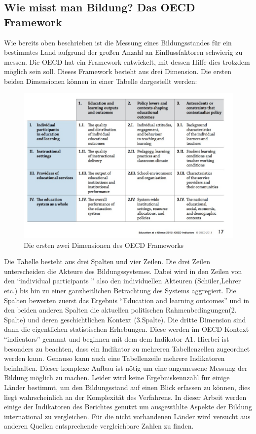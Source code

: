 \subsection*{Wie misst man Bildung? Das OECD Framework}
Wie bereits oben beschrieben ist die Messung eines Bildungsstandes für ein bestimmtes Land aufgrund der großen Anzahl an Einflussfaktoren schwierig zu messen. Die OECD hat ein Framework entwickelt, mit dessen Hilfe dies trotzdem möglich sein soll. Dieses Framework besteht aus drei Dimension. Die ersten beiden Dimensionen können in einer Tabelle dargestellt werden:

\begin{figure}[H]
\includegraphics[width=13cm]{./images/oecdframe.jpg}
\center
\caption{Die ersten zwei Dimensionen des OECD Frameworks \cite[17]{oecd5} }
\end{figure}



Die Tabelle besteht aus drei Spalten und vier Zeilen. Die drei Zeilen unterscheiden die Akteure des Bildungssystemes. Dabei wird in den Zeilen von den ``individual participants '' also den individuellen Akteuren (Schüler,Lehrer etc.) bis hin zu einer ganzheitlichen Betrachtung des Systems aggregiert. Die Spalten bewerten zuerst das Ergebnis ``Education and learning outcomes'' und in den beiden anderen Spalten die aktuellen politischen Rahmenbedingungen(2. Spalte) und deren geschichtlichen Kontext (3.Spalte).
Die dritte Dimension sind dann die eigentlichen statistischen Erhebungen. Diese werden im OECD Kontext ``indicators'' genannt und beginnen mit dem dem Indikator A1.
Hierbei ist besonders zu beachten, dass ein Indikator zu mehreren Tabellenzellen zugeordnet werden kann. Genauso kann auch eine Tabellenzeile mehrere Indikatoren beinhalten.
Dieser komplexe Aufbau ist nötig um eine angemessene Messung der Bildung möglich zu machen. Leider wird keine Ergebniskennzahl für einige Länder bestimmt, um den Bildungsstand auf einen Blick erfassen zu können, dies liegt wahrscheinlich an der Komplexität des Verfahrens.
In dieser Arbeit werden einige der Indikatoren des Berichtes genutzt um ausgewählte Aspekte der Bildung international zu vergleichen. Für die nicht vorhandenen Länder wird versucht aus anderen Quellen entsprechende vergleichbare Zahlen zu finden.

